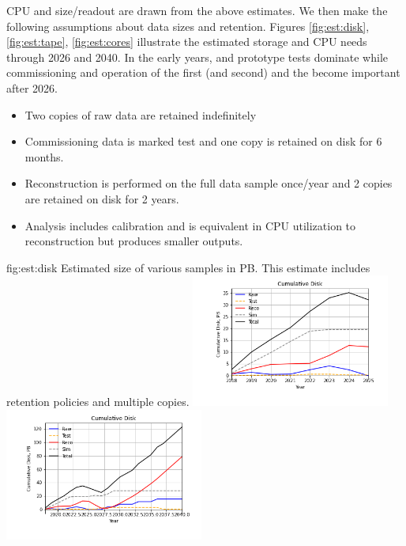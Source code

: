 \documentclass[../main-v1.tex]{subfiles}
\begin{document}
CPU and size/readout are drawn from the above estimates. We then make the following assumptions about data sizes and retention.  
Figures \ref{fig:est:disk}, \ref{fig:est:tape}, \ref{fig:est:cores} illustrate the estimated storage and CPU needs through 2026 and 2040.  In the early years,  and  prototype tests dominate while commissioning and operation of the first (and second)  and the  become important after 2026. 

\begin{itemize}
\item Two copies of raw data are retained indefinitely
\item Commissioning data is marked test and one copy is retained on disk for 6 months. 
\item Reconstruction is performed on the full data sample once/year and 2 copies are retained on disk for 2 years.  
\item Analysis includes calibration and is  equivalent in CPU utilization to reconstruction but produces smaller outputs. 
\end{itemize}

\begin{dunefigure}
{fig:est:disk}
{Estimated size of various samples in PB. This estimate includes retention policies and multiple copies.}
\includegraphics[width=0.49\textwidth]{graphics/IntroFigures/soon/Cumulative-Disk.png}
\includegraphics[width=0.49\textwidth]{graphics/IntroFigures/2040/Cumulative-Disk.png}
\end{dunefigure}
\end{document}
